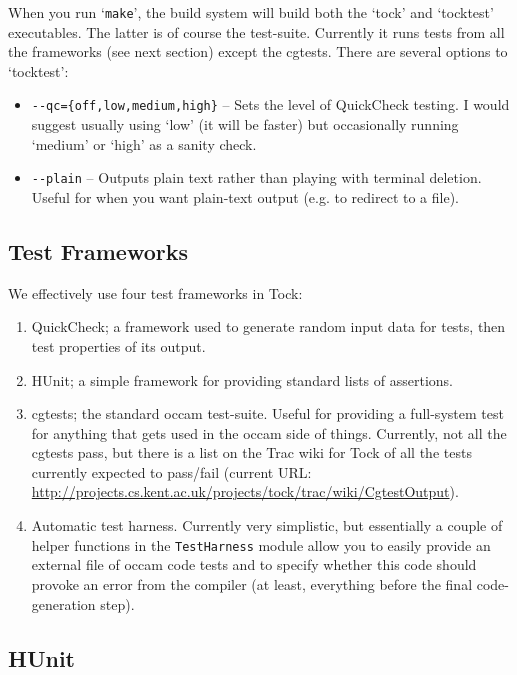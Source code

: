 \documentclass[a4wide]{article}
\begin{document}
When you run `\verb|make|', the build system will build both the `tock' and `tocktest' executables.
The latter is of course the test-suite.  Currently it runs tests from all the frameworks (see next section)
except the cgtests.  There are several options to `tocktest':

\begin{itemize}
\item \verb|--qc={off,low,medium,high}| -- Sets the level of QuickCheck testing.  I would suggest usually using
`low' (it will be faster) but occasionally running `medium' or `high' as a sanity check.
\item \verb|--plain| -- Outputs plain text rather than playing with terminal deletion.  Useful for 
when you want plain-text output (e.g. to redirect to a file).
\end{itemize}

\subsection{Test Frameworks}

We effectively use four test frameworks in Tock:

\begin{enumerate}
\item QuickCheck; a framework used to generate random input data for tests, then test properties of its output.
\item HUnit; a simple framework for providing standard lists of assertions.
\item cgtests; the standard occam test-suite.  Useful for providing a full-system test for anything that gets
used in the occam side of things.  Currently, not all the cgtests pass, but there is a list on the Trac wiki
for Tock of all the tests currently expected to pass/fail (current URL:
\url{http://projects.cs.kent.ac.uk/projects/tock/trac/wiki/CgtestOutput}).
\item Automatic test harness.  Currently very simplistic, but essentially a couple of helper functions in the
\lstinline|TestHarness| module allow you to easily provide an external file of occam code tests and to specify
whether this code should provoke an error from the compiler (at least, everything before the final 
code-generation step).
\end{enumerate}

\subsection{HUnit}
\end{document}
